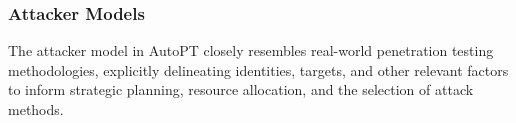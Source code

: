 
\subsubsection{Attacker Models}



The attacker model in AutoPT closely resembles real-world penetration testing methodologies, explicitly delineating identities, targets, and other relevant factors to inform strategic planning, resource allocation, and the selection of attack methods.


